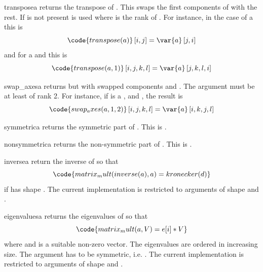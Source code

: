 \begin{funcdesc}{transpose}{a}
returns the transpose of . This swaps the first 
components of  with the rest. If  is not
present  is used where  is the rank of .
For instance, in the case of a \RankTwo this is
\begin{equation}
\code{transpose(a)}\left[i,j\right]=\var{a} \left[j,i\right]
\end{equation}
and for a \RankFour and  this is
\begin{equation}
\code{transpose(a,1)}\left[i,j,k,l\right]=\var{a} \left[j,k,l,i\right]
\end{equation}
\end{funcdesc}

\begin{funcdesc}{swap_axes}{a}
returns  but with swapped components  and .
The argument  must be at least of rank 2. For instance, if 
is a \RankFour,  and , the result is
\begin{equation}
\code{swap_axes(a,1,2)}\left[i,j,k,l\right]=\var{a} \left[i,k,j,l\right]
\end{equation}
\end{funcdesc}

\begin{funcdesc}{symmetric}{a}
returns the symmetric part of . This is .
\end{funcdesc}

\begin{funcdesc}{nonsymmetric}{a}
returns the non-symmetric part of . This is .
\end{funcdesc}

\begin{funcdesc}{inverse}{a}
return the inverse of  so that
\begin{equation}
\code{matrix_mult(inverse(a),a)=kronecker(d)}
\end{equation}
if  has shape . The current implementation is restricted to
arguments of shape  and .
\end{funcdesc}

\begin{funcdesc}{eigenvalues}{a}
returns the eigenvalues of  so that
\begin{equation}
\code{matrix_mult(a,V)=e[i]*V}
\end{equation}
where  and  is a suitable non-zero vector.
The eigenvalues are ordered in increasing size.
The argument  has to be symmetric, i.e. .
The current implementation is restricted to arguments of shape 
and .
\end{funcdesc}

